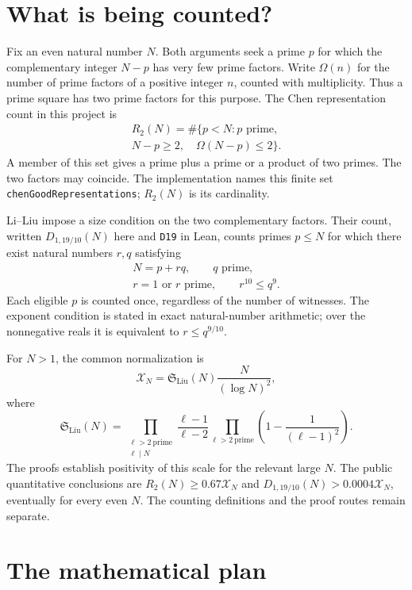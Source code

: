 \section{What is being counted?}

Fix an even natural number $N$. Both arguments seek a prime $p$ for which the
complementary integer $N-p$ has very few prime factors. Write $\Omega(n)$ for
the number of prime factors of a positive integer $n$, counted with
multiplicity. Thus a prime square has two prime factors for this purpose.
The Chen representation count in this project is
\[\begin{gathered}
 R_2(N)=\#\{p<N:p\text{ prime},\\
 N-p\ge2,\quad\Omega(N-p)\le2\}.
\end{gathered}\]
A member of this set gives a prime plus a prime or a product of two primes.
The two factors may coincide. The implementation names this finite set
\texttt{chenGoodRepresentations}; $R_2(N)$ is its cardinality.

Li--Liu impose a size condition on the two complementary factors. Their
count, written $D_{1,19/10}(N)$ here and \texttt{D19} in Lean, counts primes
$p\le N$ for which there exist natural numbers $r,q$ satisfying
\[\begin{gathered}
 N=p+rq,\qquad q\text{ prime},\\
 r=1\text{ or }r\text{ prime},\qquad r^{10}\le q^9.
\end{gathered}\]
Each eligible $p$ is counted once, regardless of the number of witnesses.
The exponent condition is stated in exact natural-number arithmetic; over
the nonnegative reals it is equivalent to $r\le q^{9/10}$.

For $N>1$, the common normalization is
\[
 \mathcal X_N=\mathfrak S_{\mathrm{Liu}}(N)\frac{N}{(\log N)^2},
\]
where
\[
 \mathfrak S_{\mathrm{Liu}}(N)=
 \prod_{\substack{\ell>2\ \mathrm{prime}\\\ell\mid N}}
       \frac{\ell-1}{\ell-2}
 \prod_{\ell>2\ \mathrm{prime}}\left(1-\frac{1}{(\ell-1)^2}\right).
\]
The proofs establish positivity of this scale for the relevant large $N$.
The public quantitative conclusions are $R_2(N)\ge0.67\mathcal X_N$ and
$D_{1,19/10}(N)>0.0004\mathcal X_N$, eventually for every even $N$.
The counting definitions and the proof routes remain separate.

\section{The mathematical plan}

